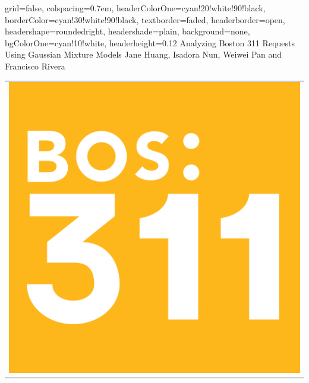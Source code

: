 \documentclass[landscape,a0paper,fontscale=0.292]{baposter}
\begin{document}
\begin{poster}{
 grid=false,
 colspacing=0.7em,
 headerColorOne=cyan!20!white!90!black,
 borderColor=cyan!30!white!90!black,
 textborder=faded,
 headerborder=open,
 headershape=roundedright,
 headershade=plain,
 background=none,
 bgColorOne=cyan!10!white,
 headerheight=0.12\textheight}
 {
 }
 {\sc\Huge Analyzing Boston 311 Requests Using Gaussian Mixture Models}
 {Jane Huang, Isadora Nun, Weiwei Pan and Francisco Rivera\\[1em]
}
 {
  \begin{tabular}{r}
    \includegraphics[height=0.12\textheight]{bos_logo_sm}
  \end{tabular}
 }



\end{poster}
\end{document}
